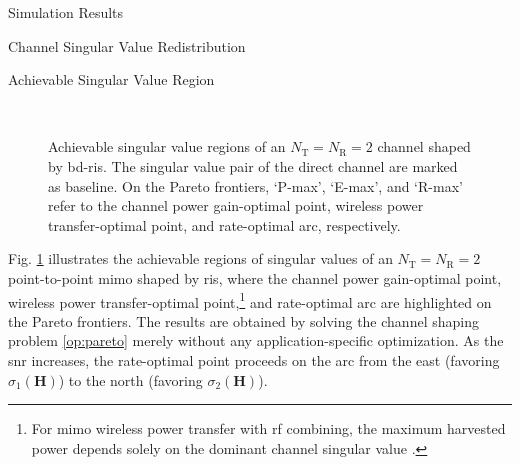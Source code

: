 \documentclass[journal]{IEEEtran}
\begin{document}
\begin{section}{Simulation Results}
	\begin{subsection}{Channel Singular Value Redistribution}
		\begin{subsubsection}{Achievable Singular Value Region}
			\begin{figure}[!t]
				\centering
				\\
				\caption{Achievable singular value regions of an $N_\mathrm{T}=N_\mathrm{R}=2$ channel shaped by \gls{bd}-\gls{ris}. The singular value pair of the direct channel are marked as baseline.
				On the Pareto frontiers, `P-max', `E-max', and `R-max' refer to the channel power gain-optimal point, wireless power transfer-optimal point, and rate-optimal arc, respectively.}
				\label{fg:singular_pareto}
			\end{figure}
			Fig. \ref{fg:singular_pareto} illustrates the achievable regions of singular values of an $N_\mathrm{T}=N_\mathrm{R}=2$ point-to-point \gls{mimo} shaped by \gls{ris}, where the channel power gain-optimal point, wireless power transfer-optimal point,\footnote{For \gls{mimo} wireless power transfer with \gls{rf} combining, the maximum harvested power depends solely on the dominant channel singular value \cite{Shen2021}.} and rate-optimal arc are highlighted on the Pareto frontiers.
			The results are obtained by solving the channel shaping problem \eqref{op:pareto} merely without any application-specific optimization.
			As the \gls{snr} increases, the rate-optimal point proceeds on the arc from the east (favoring $\sigma_1(\mathbf{H})$) to the north (favoring $\sigma_2(\mathbf{H})$).

\end{subsubsection}
\end{subsection}
\end{section}
\end{document}
